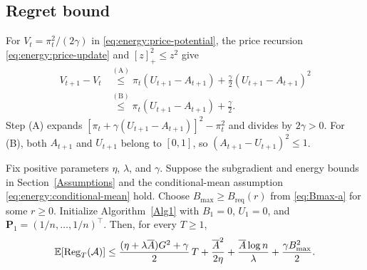 \subsection{Regret bound}
\label{sec:energy:battery-potential}

For $V_t=\pi_t^2/(2\gamma)$ in \eqref{eq:energy:price-potential},
the price recursion \eqref{eq:energy:price-update} and
$[z]_+^2\leq z^2$ give
\begin{equation}\label{eq:include}
\begin{aligned}
 V_{t+1}-V_t
 &\overset{\mathrm{(A)}}{\leq}\pi_t(U_{t+1}-A_{t+1})
   +\frac\gamma2(U_{t+1}-A_{t+1})^2\\
 &\overset{\mathrm{(B)}}{\leq}\pi_t(U_{t+1}-A_{t+1})+\frac{\gamma}{2}.
\end{aligned}
\end{equation}
Step (A) expands $[\pi_t+\gamma(U_{t+1}-A_{t+1})]^2-\pi_t^2$
and divides by $2\gamma>0$. For (B), both $A_{t+1}$ and $U_{t+1}$
belong to $[0,1]$, so $(A_{t+1}-U_{t+1})^2\leq1$.

\begin{Thm:Theorem}
\label{Main Theorem}
Fix positive parameters $\eta$, $\lambda$, and $\gamma$. Suppose the
subgradient and energy bounds in Section~\ref{Assumptions} and the
conditional-mean assumption \eqref{eq:energy:conditional-mean} hold.
Choose $B_{\mathrm{max}}\geq B_{\mathrm{req}}(r)$ from \eqref{eq:Bmax-a}
for some $r\geq0$.
Initialize Algorithm~\ref{Alg1} with $B_1=0$,
$U_1=0$, and $\mathbf{P}_1=(1/n,\ldots,1/n)^\top$.
Then, for every $T\geq1$,
\begin{equation}
\label{eq: Regret}
  \mathbb{E}[\mathrm{Reg}_T(\mathcal A)]
  \leq\frac{(\eta+\lambda \overline A)G^2+\gamma}{2}\,T
       +\frac{\overline A^2}{2\eta}
       +\frac{\overline A\log n}{\lambda}
       +\frac{\gamma B_{\mathrm{max}}^2}{2}.
\end{equation}
\end{Thm:Theorem}


